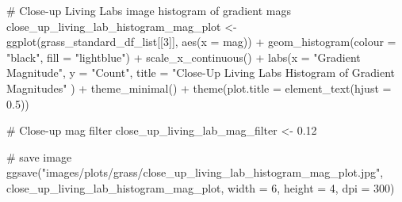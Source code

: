 \documentclass[
  letterpaper,
  DIV=11,
  numbers=noendperiod]{scrreprt}
\newenvironment{Shaded}{\begin{snugshade}}{\end{snugshade}}
\newcommand{\AttributeTok}[1]{\textcolor[rgb]{0.40,0.45,0.13}{#1}}
\newcommand{\CommentTok}[1]{\textcolor[rgb]{0.37,0.37,0.37}{#1}}
\newcommand{\DecValTok}[1]{\textcolor[rgb]{0.68,0.00,0.00}{#1}}
\newcommand{\FloatTok}[1]{\textcolor[rgb]{0.68,0.00,0.00}{#1}}
\newcommand{\FunctionTok}[1]{\textcolor[rgb]{0.28,0.35,0.67}{#1}}
\newcommand{\NormalTok}[1]{\textcolor[rgb]{0.00,0.23,0.31}{#1}}
\newcommand{\OtherTok}[1]{\textcolor[rgb]{0.00,0.23,0.31}{#1}}
\newcommand{\SpecialCharTok}[1]{\textcolor[rgb]{0.37,0.37,0.37}{#1}}
\newcommand{\StringTok}[1]{\textcolor[rgb]{0.13,0.47,0.30}{#1}}
\begin{document}
\begin{Shaded}
\begin{Highlighting}[]
\CommentTok{\# Close{-}up Living Labs image histogram of gradient mags}
\NormalTok{close\_up\_living\_lab\_histogram\_mag\_plot }\OtherTok{\textless{}{-}}
  \FunctionTok{ggplot}\NormalTok{(grass\_standard\_df\_list[[}\DecValTok{3}\NormalTok{]], }
         \FunctionTok{aes}\NormalTok{(}\AttributeTok{x =}\NormalTok{ mag)) }\SpecialCharTok{+}
  \FunctionTok{geom\_histogram}\NormalTok{(}\AttributeTok{colour =} \StringTok{"black"}\NormalTok{, }\AttributeTok{fill =} \StringTok{"lightblue"}\NormalTok{) }\SpecialCharTok{+}
  \FunctionTok{scale\_x\_continuous}\NormalTok{() }\SpecialCharTok{+} 
  \FunctionTok{labs}\NormalTok{(}\AttributeTok{x =} \StringTok{"Gradient Magnitude"}\NormalTok{, }
       \AttributeTok{y =} \StringTok{"Count"}\NormalTok{, }
       \AttributeTok{title =} \StringTok{"Close{-}Up Living Labs Histogram of Gradient Magnitudes"}
\NormalTok{       ) }\SpecialCharTok{+}
  \FunctionTok{theme\_minimal}\NormalTok{() }\SpecialCharTok{+}
  \FunctionTok{theme}\NormalTok{(}\AttributeTok{plot.title =} \FunctionTok{element\_text}\NormalTok{(}\AttributeTok{hjust =} \FloatTok{0.5}\NormalTok{))}

\CommentTok{\# Close{-}up mag filter}
\NormalTok{close\_up\_living\_lab\_mag\_filter }\OtherTok{\textless{}{-}} \FloatTok{0.12}

\CommentTok{\# save image}
\FunctionTok{ggsave}\NormalTok{(}\StringTok{"images/plots/grass/close\_up\_living\_lab\_histogram\_mag\_plot.jpg"}\NormalTok{, close\_up\_living\_lab\_histogram\_mag\_plot, }\AttributeTok{width =} \DecValTok{6}\NormalTok{, }\AttributeTok{height =} \DecValTok{4}\NormalTok{, }\AttributeTok{dpi =} \DecValTok{300}\NormalTok{)}
\end{Highlighting}
\end{Shaded}
\end{document}
